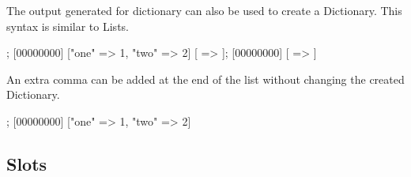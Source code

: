 The output generated for dictionary can also be used to create a
Dictionary.  This syntax is similar to Lists.

\begin{urbiscript}
["one" => 1, "two" => 2];
[00000000] ["one" => 1, "two" => 2]
[ => ];
[00000000] [ => ]
\end{urbiscript}

An extra comma can be added at the end of the list without changing the
created Dictionary.

\begin{urbiscript}
[
  "one" => 1,
  "two" => 2,
];
[00000000] ["one" => 1, "two" => 2]
\end{urbiscript}

\subsection{Slots}

